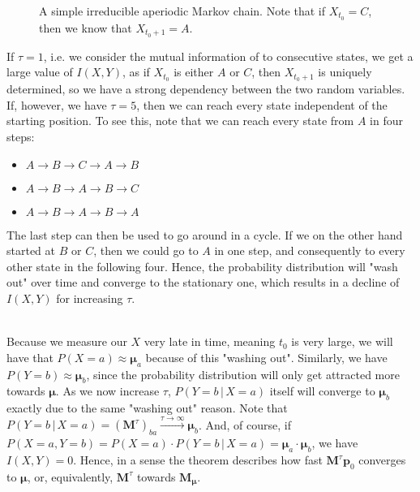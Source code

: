 \documentclass[../../main.tex]{subfiles}
\begin{document}
    \begin{figure}[h]
    \center
    \caption{A simple irreducible aperiodic Markov chain. Note that if $X_{t_0} = C$, then we know that $X_{t_0+1} = A$.}
    \label{fig:markov_chain}
    \end{figure}

    \noindent
    If $\tau = 1$, i.e. we consider the mutual information of to consecutive states, we get a large value of $I(X, Y)$, as if $X_{t_0}$ is either $A$ or $C$, then $X_{t_0+1}$ is uniquely determined, so we have a strong dependency between the two random variables. If, however, we have $\tau = 5$, then we can reach every state independent of the starting position. To see this, note that we can reach every state from $A$ in four steps:
    \begin{itemize}
        \item $A \rightarrow B \rightarrow C \rightarrow A \rightarrow B$
        \item $A \rightarrow B \rightarrow A \rightarrow B \rightarrow C$
        \item $A \rightarrow B \rightarrow A \rightarrow B \rightarrow A$
    \end{itemize}
    The last step can then be used to go around in a cycle. If we on the other hand started at $B$ or $C$, then we could go to $A$ in one step, and consequently to every other state in the following four. Hence, the probability distribution will "wash out" over time and converge to the stationary one, which results in a decline of $I(X, Y)$ for increasing $\tau$.
    
    ~\\
    Because we measure our $X$ very late in time, meaning $t_0$ is very large, we will have that $P(X = a) \approx \boldsymbol{\mu}_a$ because of this "washing out". Similarly, we have $P(Y = b) \approx \boldsymbol{\mu}_b$, since the probability distribution will only get attracted more towards $\boldsymbol{\mu}$. As we now increase $\tau$, $P(Y = b \,|\, X = a)$ itself will converge to $\boldsymbol{\mu}_b$ exactly due to the same "washing out" reason. Note that $P(Y = b \,|\, X = a) = (\boldsymbol{M}^{\tau})_{ba} \xrightarrow{\tau \to \infty}  \boldsymbol{\mu}_b$. And, of course, if $P(X = a, Y = b) = P(X = a) \cdot P(Y = b \,|\, X = a) = \boldsymbol{\mu}_a \cdot \boldsymbol{\mu}_b$, we have $I(X, Y) = 0$. Hence, in a sense the theorem describes how fast $\boldsymbol{M}^{\tau}\bm{p}_0$ converges to $\boldsymbol{\mu}$, or, equivalently, $\boldsymbol{M}^{\tau}$ towards $\boldsymbol{M}_{\boldsymbol{\mu}}$.
\end{document}
